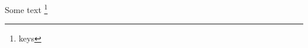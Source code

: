 \documentclass{beamer}
\begin{document}
\begin{frame}           
Some text \footnote{keys}
\end{frame}
\end{document}
